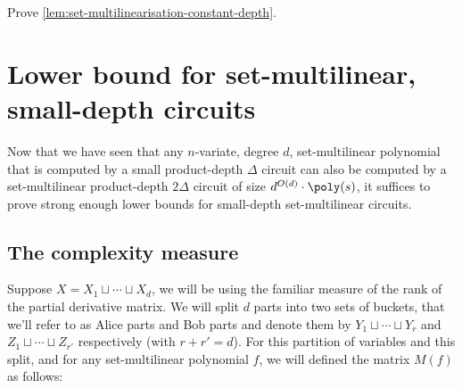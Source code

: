 \begin{exercise}
Prove \autoref{lem:set-multilinearisation-constant-depth}. 
\end{exercise}

\section{Lower bound for set-multilinear, small-depth circuits}

Now that we have seen that any $n$-variate, degree $d$, set-multilinear polynomial that is computed by a small product-depth $\Delta$ circuit can also be computed by a set-multilinear product-depth $2\Delta$ circuit of size $d^{O(d)} \cdot \poly(s)$, it suffices to prove strong enough lower bounds for small-depth set-multilinear circuits.

\subsection{The complexity measure}

Suppose $X = X_1 \sqcup \cdots \sqcup X_d$, we will be using the familiar measure of the rank of the partial derivative matrix. We will split $d$ parts into two sets of buckets, that we'll refer to as Alice parts and Bob parts and denote them by $Y_1 \sqcup \cdots \sqcup Y_r$ and $Z_1 \sqcup \cdots \sqcup Z_{r'}$ respectively (with $r + r' = d$). For this partition of variables and this split, and for any set-multilinear polynomial $f$, we will defined the matrix $M(f)$ as follows:


